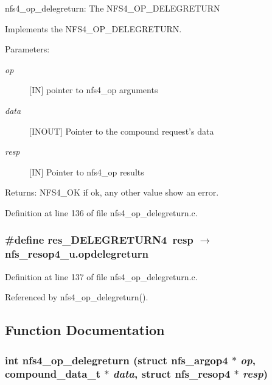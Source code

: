 nfs4\_\-op\_\-delegreturn: The NFS4\_\-OP\_\-DELEGRETURN

Implements the NFS4\_\-OP\_\-DELEGRETURN.

\begin{Desc}
\item[Parameters:]
\begin{description}
\item[{\em op}][IN] pointer to nfs4\_\-op arguments \item[{\em data}][INOUT] Pointer to the compound request's data \item[{\em resp}][IN] Pointer to nfs4\_\-op results\end{description}
\end{Desc}
\begin{Desc}
\item[Returns:]NFS4\_\-OK if ok, any other value show an error. \end{Desc}


Definition at line 136 of file nfs4\_\-op\_\-delegreturn.c.
\subsubsection{\setlength{\rightskip}{0pt plus 5cm}\#define res\_\-DELEGRETURN4\ resp $\rightarrow$ nfs\_\-resop4\_\-u.opdelegreturn}\label{nfs4__op__delegreturn_8c_a1}




Definition at line 137 of file nfs4\_\-op\_\-delegreturn.c.

Referenced by nfs4\_\-op\_\-delegreturn().

\subsection{Function Documentation}
\subsubsection{\setlength{\rightskip}{0pt plus 5cm}int nfs4\_\-op\_\-delegreturn (struct nfs\_\-argop4 $\ast$ {\em op}, compound\_\-data\_\-t $\ast$ {\em data}, struct nfs\_\-resop4 $\ast$ {\em resp})}\label{nfs4__op__delegreturn_8c_a2}




